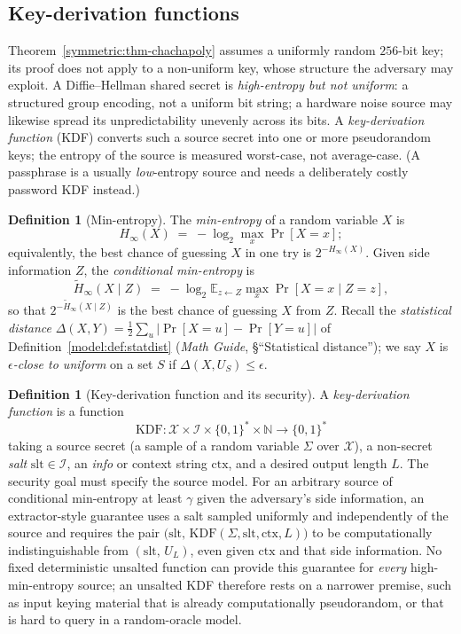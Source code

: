 \documentclass[11pt,a4paper]{article}
\theoremstyle{definition}
\newtheorem{definition}[theorem]{Definition}
\theoremstyle{remark}
\newcommand{\N}{\ensuremath{\mathbb{N}}}
\newcommand{\E}{\ensuremath{\mathbb{E}}}
\begin{document}
\subsection{Key-derivation functions}\label{symmetric:subsec:kdf}

Theorem~\ref{symmetric:thm-chachapoly} assumes a uniformly random
\(256\)-bit key; its proof does not apply to a non-uniform key, whose
structure the adversary may exploit. A Diffie--Hellman shared secret is
\emph{high-entropy but not uniform}: a structured group encoding, not a
uniform bit string; a hardware noise source may likewise spread its
unpredictability unevenly across its bits. A \emph{key-derivation
function} (KDF) converts such a source secret into one or more
pseudorandom keys; the entropy of the source is measured worst-case,
not average-case. (A passphrase is a usually \emph{low}-entropy source
and needs a deliberately costly password KDF instead.)

\begin{definition}[Min-entropy]\label{symmetric:def-minentropy}
The \emph{min-entropy} of a random variable \(X\) is
\[
H_{\infty}(X) \;=\; -\log_{2} \max_{x} \Pr[X = x];
\]
equivalently, the best chance of guessing \(X\) in one try is
\(2^{-H_{\infty}(X)}\). Given side information \(Z\), the
\emph{conditional min-entropy} is
\[
\tilde H_{\infty}(X \mid Z) \;=\;
-\log_{2} \E_{z \gets Z} \max_{x} \Pr[X = x \mid Z = z],
\]
so that \(2^{-\tilde H_{\infty}(X \mid Z)}\) is the best chance of
guessing \(X\) from \(Z\). Recall the \emph{statistical distance}
\(\Delta(X, Y) = \tfrac12 \sum_{u} |\Pr[X = u] - \Pr[Y = u]|\) of
Definition~\ref{model:def:statdist} (\emph{Math Guide},
\S``Statistical distance''); we say \(X\) is
\emph{\(\epsilon\)-close to uniform} on a set \(S\) if
\(\Delta(X, U_{S}) \le \epsilon\).
\end{definition}

\begin{definition}[Key-derivation function and its security]
\label{symmetric:def-kdf}
A \emph{key-derivation function} is a function
\[
\mathrm{KDF} : \mathcal{X} \times \mathcal{I} \times \{0,1\}^{\ast}
\times \N \to \{0,1\}^{\ast}
\]
taking a source secret (a sample of a random variable \(\Sigma\) over
\(\mathcal{X}\)), a non-secret \emph{salt}
\(\mathrm{slt} \in \mathcal{I}\), an \emph{info} or context string
\(\mathrm{ctx}\), and a desired output length \(L\). The security
goal must specify the source model. For an arbitrary source of
conditional min-entropy at least \(\gamma\) given the adversary's
side information, an extractor-style guarantee uses
a salt sampled uniformly and independently of the source and
requires the pair
\(\bigl(\mathrm{slt},\,
\mathrm{KDF}(\Sigma, \mathrm{slt}, \mathrm{ctx}, L)\bigr)\) to be
computationally indistinguishable from \((\mathrm{slt},\, U_{L})\),
even given \(\mathrm{ctx}\) and that side information. No fixed
deterministic unsalted function can provide this guarantee for
\emph{every} high-min-entropy source; an unsalted KDF therefore
rests on a narrower premise, such as input keying material that is
already computationally pseudorandom, or that is hard to query in a
random-oracle model.
\end{definition}
\end{document}
